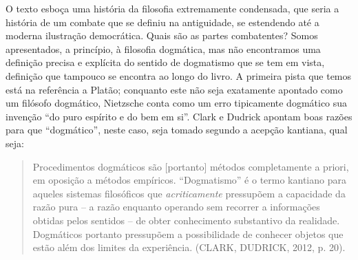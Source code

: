 \documentclass[
	12pt,				%
	openright,			%
	oneside,			%
	a4paper,			%
	english,			%
	french,				%
	spanish,			%
	brazil				%
	]{abntex2}
\begin{document}
O texto esboça uma história da filosofia extremamente condensada, que seria a história de um combate que se definiu na antiguidade, se estendendo até a moderna ilustração democrática. Quais são as partes combatentes? Somos apresentados, a princípio, à filosofia dogmática, mas não encontramos uma definição precisa e explícita do sentido de dogmatismo que se tem em vista, definição que tampouco se encontra ao longo do livro. A primeira pista que temos está na referência a Platão; conquanto este não seja exatamente apontado como um filósofo dogmático, Nietzsche conta como um erro tipicamente dogmático sua invenção “do puro espírito e do bem em si”. Clark e Dudrick apontam boas razões para que “dogmático”, neste caso, seja tomado segundo a acepção kantiana, qual seja:

\begin{quotation}
Procedimentos dogmáticos são [portanto] métodos completamente a priori, em oposição a métodos empíricos. “Dogmatismo” é o termo kantiano para aqueles sistemas filosóficos que \textit{acriticamente} pressupõem a capacidade da razão pura – a razão enquanto operando sem recorrer a informações obtidas pelos sentidos – de obter conhecimento substantivo da realidade. Dogmáticos portanto pressupõem a possibilidade de conhecer objetos que estão além dos limites da experiência. (CLARK, DUDRICK, 2012, p. 20).
\end{quotation}
\end{document}
